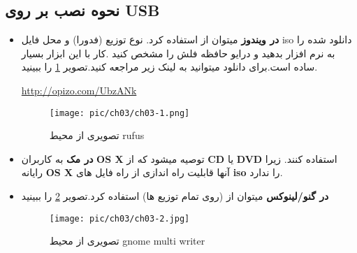 \subsection{نحوه نصب بر روی USB}\label{se-212}
\begin{itemize}
	\item \textbf{در ویندوز}\label{amozesh-windows-2}
	میتوان از 
	استفاده کرد.  نوع توزیع (فدورا) و محل فایل iso دانلود شده را به نرم افزار بدهید و درایو حافظه فلش را مشخص کنید .کار با این ابزار بسیار ساده است.برای دانلود میتوانید به لینک زیر مراجعه کنید.تصویر 
	\ref{pic-1}
	را ببینید.
\begin{flushleft}
	\href{http://linuxfedora.ir.uploadboy.me/p2y1j2jf5c0e/rufus-2.18.exe.html
	}{http://opizo.com/UbzANk}
\end{flushleft}
\begin{figure}[H]%
	\caption{تصویری از محیط rufus}
	\begin{center}
		\texttt{[image: pic/ch03/ch03-1.png]}
	\end{center}
	\label{pic-1}
\end{figure}
\item \textbf{در مک}\label{amozesh-mac2}
به کاربران 
\textbf{OS X}
توصیه میشود که از
\textbf{CD}
یا
\textbf{DVD}
استفاده کنند. زیرا رایانه 
\textbf{OS X}
آنها قابلیت راه اندازی از راه فایل های
\textbf{iso}
را ندارد.
\item \textbf{در گنو/لینوکس}\label{amozesh-gnu-linux2}
میتوان از 
	(روی تمام توزیع ها) استفاده کرد.تصویر \ref{pic-2}  را ببینید
\begin{figure}[H]%
	\caption{تصویری از محیط gnome multi writer}
	\begin{center}
\texttt{[image: pic/ch03/ch03-2.jpg]}
	\end{center}
\label{pic-2}
\end{figure}
\end{itemize}
